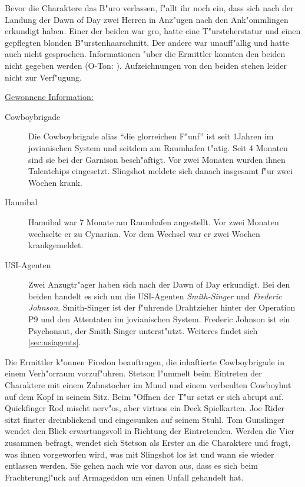 Bevor die Charaktere das B"uro verlassen, f"allt ihr noch ein, dass sich nach der Landung der Dawn of Day zwei Herren in Anz"ugen nach den Ank"ommlingen erkundigt haben. Einer der beiden war gro\3, hatte eine T"ursteherstatur und einen gepflegten blonden B"urstenhaarschnitt. Der andere war unauff"allig und hatte auch nicht gesprochen. Informationen "uber die Ermittler konnten den beiden nicht gegeben werden (O-Ton: ). Aufzeichnungen von den beiden stehen leider nicht zur Verf"ugung.

\begin{remarks}
	\underline{Gewonnene Information:}
	
	\begin{description}
		\item[Cowboybrigade] Die Cowboybrigade alias ``die glorreichen F"unf'' ist seit 1\half Jahren im jovianischen System und seitdem am 
			Raumhafen t"atig. Seit 4 Monaten sind sie bei der Garnison besch"aftigt. Vor zwei Monaten wurden ihnen Talentchips eingesetzt. Slingshot meldete sich danach insgesamt f"ur zwei Wochen krank.
		\item[Hannibal] Hannibal war 7 Monate am Raumhafen angestellt. Vor zwei Monaten wechselte er zu Cynarian. Vor dem Wechsel war er 	
			zwei Wochen krankgemeldet.
		\item[USI-Agenten] Zwei Anzugtr"ager haben sich nach der Dawn of Day erkundigt. Bei den beiden handelt es sich um die USI-Agenten  
			\emph{Smith-Singer} und \emph{Frederic Johnson}. Smith-Singer ist der f"uhrende Drahtzieher hinter der Operation P9 und den Attentaten im jovianischen System. Frederic Johnson ist ein Psychonaut, der Smith-Singer unterst"utzt. Weiteres findet sich \cref{sec:usiagents}.
	\end{description}
\end{remarks}


Die Ermittler k"onnen Firedon beauftragen, die inhaftierte Cowboybrigade in einem Verh"orraum vorzuf"uhren. Stetson l"ummelt beim Eintreten der Charaktere mit einem Zahnstocher im Mund und einem verbeulten Cowboyhut auf dem Kopf in seinem Sitz. Beim "Offnen der T"ur setzt er sich abrupt auf. Quickfinger Rod mischt nerv"os, aber virtuos ein Deck Spielkarten. Joe Rider sitzt finster dreinblickend und eingesunken auf seinem Stuhl. Tom Gunslinger wendet den Blick erwartungsvoll in Richtung der Eintretenden. Werden die Vier zusammen befragt, wendet sich Stetson als Erster an die Charaktere und fragt, was ihnen vorgeworfen wird, was mit Slingshot los ist und wann sie wieder entlassen werden. Sie gehen nach wie vor davon aus, dass es sich beim Frachterungl"uck auf Armageddon um einen Unfall gehandelt hat.

